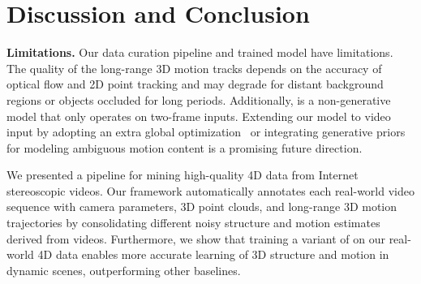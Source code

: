 \section{Discussion and Conclusion}
\noindent \textbf{Limitations.} 
Our data curation pipeline and trained model have limitations. 
The quality of the long-range 3D motion tracks depends on the accuracy of optical flow and 2D point tracking and may degrade for distant background regions or objects occluded for long periods.
Additionally, \method is a non-generative model that only operates on two-frame inputs. 
Extending our model to video input by adopting an extra global optimization~\cite{zhang2024monst3r} or integrating generative priors for modeling ambiguous motion content is a promising future direction.

We presented a pipeline for mining high-quality 4D data from Internet stereoscopic videos. Our framework automatically annotates each real-world video sequence with camera parameters, 3D point clouds, and long-range 3D motion trajectories by consolidating different noisy structure and motion estimates derived from videos.  Furthermore, we show that training a variant of \duster on our real-world 4D data enables more accurate learning of 3D structure and motion in dynamic scenes, outperforming other baselines.

